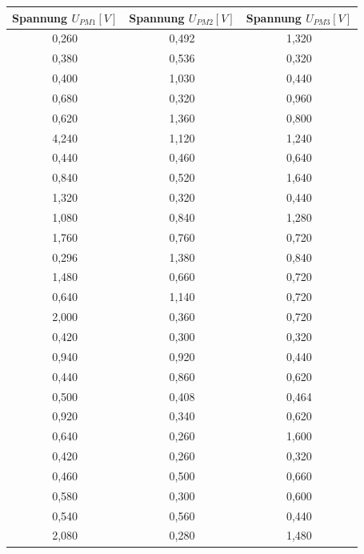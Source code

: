                 \begin{table}[ht]
                    \tiny\centering
                    \begin{tabular}{c|c|c}
                        Spannung $U_{PM1} [\unit{V}]$ & Spannung $U_{PM2} [\unit{V}]$ & Spannung $U_{PM3} [\unit{V}]$ \\ 
                        \hline       0,260 & 0,492 & 1,320\\
                        0,380 & 0,536 & 0,320\\
                        0,400 & 1,030 & 0,440\\
                        0,680 & 0,320 & 0,960\\
                        0,620 & 1,360 & 0,800\\
                        4,240 & 1,120 & 1,240\\
                        0,440 & 0,460 & 0,640\\
                        0,840 & 0,520 & 1,640\\
                        1,320 & 0,320 & 0,440\\
                        1,080 & 0,840 & 1,280\\
                        1,760 &	0,760 & 0,720\\
                        0,296 & 1,380 & 0,840\\
                        1,480 & 0,660 & 0,720\\
                        0,640 & 1,140 & 0,720\\
                        2,000 & 0,360 & 0,720\\
                        0,420 & 0,300 & 0,320\\
                        0,940 & 0,920 & 0,440\\
                        0,440 & 0,860 & 0,620\\
                        0,500 & 0,408 & 0,464\\
                        0,920 & 0,340 & 0,620\\
                        0,640 & 0,260 & 1,600\\
                        0,420 & 0,260 & 0,320\\
                        0,460 & 0,500 & 0,660\\
                        0,580 & 0,300 & 0,600\\
                        0,540 & 0,560 & 0,440\\
                        2,080 & 0,280 & 1,480\\

\end{tabular}
\end{table}
